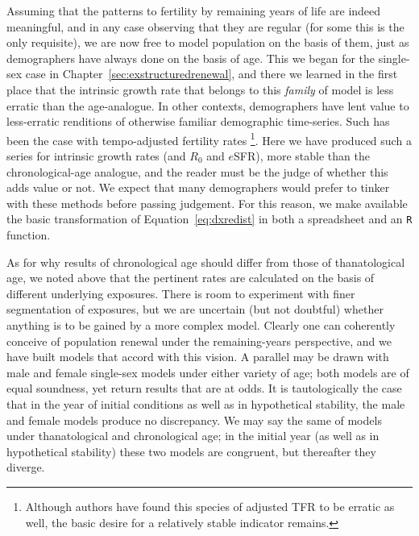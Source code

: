 Assuming that the patterns to fertility by remaining years of life
are indeed meaningful, and in any case observing that they are regular (for
some this is the only requisite), we are now free to model population on the
basis of them, just as demographers have always done on the basis of age. This we began
for the single-sex case in Chapter~\ref{sec:exstructuredrenewal}, and there we
learned in the first place that the intrinsic growth rate that belongs to this
\textit{family} of model is less erratic than the age-analogue. In other
contexts, demographers have lent value to less-erratic renditions of otherwise
familiar demographic time-series. Such has been the case with tempo-adjusted
fertility rates \citep{bongaarts1998quantum}\footnote{Although authors
\citep[e.g.,][]{kim2000quantum} have found this species of adjusted TFR to be
erratic as well, the basic desire for a relatively stable indicator remains.}.
Here we have produced such a series for intrinsic growth rates (and $R_0$ and $e$SFR), 
more stable than the chronological-age analogue, and the reader must be the 
judge of whether this adds value or not. We expect that many demographers would
prefer to tinker with these methods before passing judgement. For this reason,
we make available the basic transformation of Equation~\eqref{eq:dxredist} in both a spreadsheet and
an \texttt{R} function.

As for why results of chronological age should differ from those of
thanatological age, we noted above that the pertinent rates are calculated on
the basis of different underlying exposures. There is room to experiment with
 finer segmentation of exposures, but we are uncertain (but not doubtful)
 whether anything is to be gained by a more complex model. Clearly one can
coherently conceive of population renewal under the remaining-years
perspective, and we have built models that accord with this vision. A parallel
may be drawn with male and female single-sex models under either variety of
age; both models are of equal soundness, yet return results that are at odds. 
It is tautologically the case that in the year of initial conditions as well as
in hypothetical stability, the male and female models produce no discrepancy. We
may say the same of models under thanatological and chronological age; 
in the initial year (as well as in
hypothetical stability) these two models are congruent, but thereafter they
diverge.

